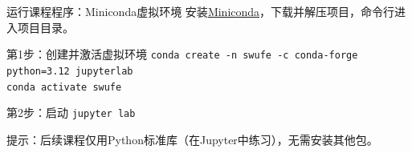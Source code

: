 \documentclass[aspectratio=169, 14pt]{beamer}
\begin{document}
\begin{frame}[fragile]{运行课程程序：Miniconda虚拟环境}
	安装\href{https://www.anaconda.com/docs/getting-started/miniconda/install}{Miniconda}，下载并解压项目，命令行进入项目目录。
	\begin{block}{第1步：创建并激活虚拟环境}
		\footnotesize
		\verb|conda create -n swufe -c conda-forge python=3.12 jupyterlab| \\
		\verb|conda activate swufe|
	\end{block}
	\begin{block}{第2步：启动}
		\small
		\verb|jupyter lab|
	\end{block}
	{\footnotesize 提示：后续课程仅用Python标准库（在Jupyter中练习），无需安装其他包。}
\end{frame}
\end{document}
